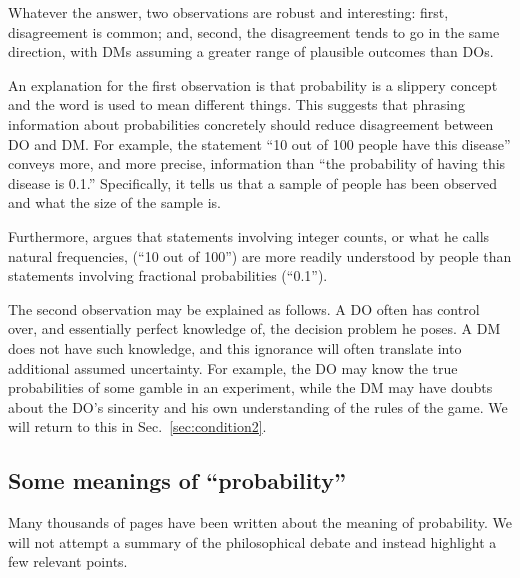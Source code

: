 \documentclass[%
	a4paper,
	abstract=true,	
	12pt,
	numbers=noenddot,
]{scrartcl}
\newcommand{\seclabel}[1]{\label{sec:#1}}
\newcommand{\secref}[1]{Sec.~\ref{sec:#1}}
\newcommand{\ie}{\textit{i.e.}\xspace}
\newcommand{\eg}{\textit{e.g.}\xspace}
\begin{document}
Whatever the answer, two observations are robust and interesting: first, disagreement is common; and, second, the disagreement tends to go in the same direction, with DMs assuming a greater range of plausible outcomes than DOs.

An explanation for the first observation is that probability is a slippery concept and the word is used to mean different things. This suggests that phrasing information about probabilities concretely should reduce disagreement between DO and DM. For example, the statement ``10 out of 100 people have this disease'' conveys more, and more precise, information than ``the probability of having this disease is 0.1.'' Specifically, it tells us that a sample of people has been observed and what the size of the sample is.

Furthermore, \textcite{Gigerenzer2018} argues that statements involving integer counts, or what he calls natural frequencies,  (``10 out of 100'') are more readily understood by people than statements involving fractional probabilities (``0.1'').

The second observation may be explained as follows. A DO often has control over, and essentially perfect knowledge of, the decision problem he poses. A DM does not have such knowledge, and this ignorance will often translate into additional assumed uncertainty. For example, the DO may know the true probabilities of some gamble in an experiment, while the DM may have doubts about the DO's sincerity and his own understanding of the rules of the game. We will return to this in \secref{condition2}.

\subsection{Some meanings of ``probability'' \seclabel{tricky}}
Many thousands of pages have been written about the meaning of probability. We will not attempt a summary of the philosophical debate and instead highlight a few relevant points.

\end{document}
